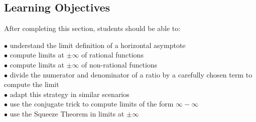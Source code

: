 \documentclass{ximera}
\begin{document}

%
%
%
%

\subsection{Learning Objectives}
After completing this section, students should be able to:
\vspace{.05in}

\noindent$\bullet$ understand the limit definition of a horizontal asymptote
\\$\bullet$ compute limits at $\pm\infty$ of rational functions
\\$\bullet$ compute limits at $\pm\infty$ of non-rational functions
\\$\bullet$ divide the numerator and denominator of a ratio by a carefully chosen term to compute the limit
\\$\bullet$ adapt this strategy in similar scenarios
\\$\bullet$ use the conjugate trick to compute limits of the form $\infty-\infty$
\\$\bullet$ use the Squeeze Theorem in limits at $\pm\infty$

\end{document}
